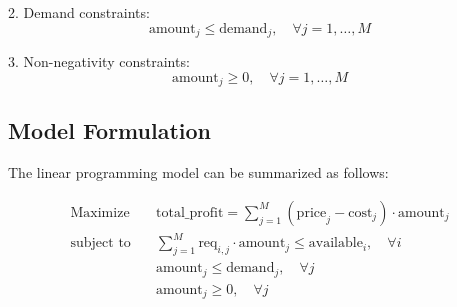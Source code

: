 \documentclass{article}
\begin{document}
2. Demand constraints:
\[
\text{amount}_j \leq \text{demand}_j, \quad \forall j = 1, \ldots, M
\]

3. Non-negativity constraints:
\[
\text{amount}_j \geq 0, \quad \forall j = 1, \ldots, M
\]

\subsection*{Model Formulation}
The linear programming model can be summarized as follows:

\begin{align*}
\text{Maximize} & \quad \text{total\_profit} = \sum_{j=1}^{M} (\text{price}_j - \text{cost}_j) \cdot \text{amount}_j \\
\text{subject to} & \quad \sum_{j=1}^{M} \text{req}_{i,j} \cdot \text{amount}_j \leq \text{available}_i, \quad \forall i \\
                  & \quad \text{amount}_j \leq \text{demand}_j, \quad \forall j \\
                  & \quad \text{amount}_j \geq 0, \quad \forall j
\end{align*}
\end{document}
